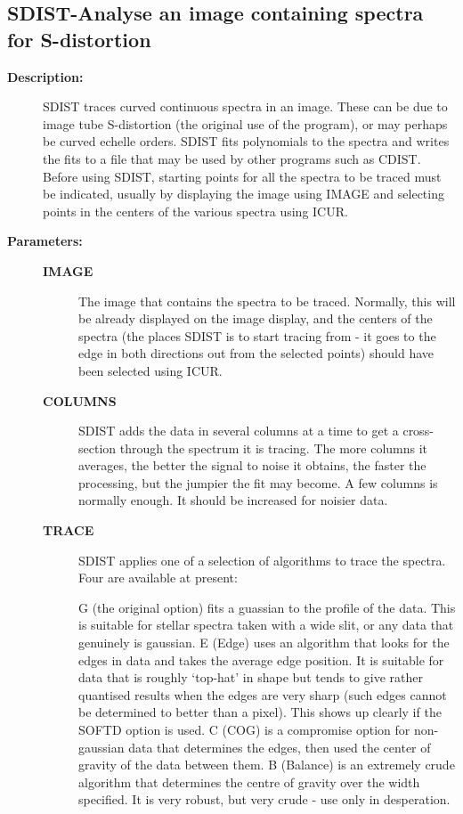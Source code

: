 \subsection{SDIST-\label{SDIST}Analyse an image containing spectra for S-distortion}
\begin{description}

\item [{\bf Description:}]
 SDIST traces curved continuous spectra in an image.  These can be
 due to image tube S-distortion (the original use of the program),
 or may perhaps be curved echelle orders.  SDIST fits polynomials
 to the spectra and writes the fits to a file that may be used by
 other programs such as CDIST.  Before using SDIST, starting points
 for all the spectra to be traced must be indicated, usually by
 displaying the image using IMAGE and selecting points in the
 centers of the various spectra using ICUR.

\item [{\bf Parameters:}]
\begin{description}
\item [{\bf IMAGE}]
 The image that contains the spectra to be traced.
 Normally, this will be already displayed on the image display, and
 the centers of the spectra (the places SDIST is to start tracing from
 - it goes to the edge in both directions out from the selected
 points) should have been selected using ICUR.
\item [{\bf COLUMNS}]
 SDIST adds the data in several columns at a time to get a
 cross-section through the spectrum it is tracing.  The more columns
 it averages, the better the signal to noise it obtains, the faster
 the processing, but the jumpier the fit may become.  A few columns is
 normally enough.  It should be increased for noisier data.
\item [{\bf TRACE}]
 SDIST applies one of a selection of algorithms to trace
 the spectra. Four are available at present:

    G (the original option) fits a guassian to the profile of the data.
      This is suitable for stellar spectra taken with a wide slit, or
      any data that genuinely is gaussian.
    E (Edge) uses an algorithm that looks for the edges in data and
      takes the average edge position. It is suitable for data that is
      roughly `top-hat' in shape but tends to give rather quantised
      results when the edges are very sharp (such edges cannot be
      determined to better than a pixel). This shows up clearly if the
      SOFTD option is used.
    C (COG) is a compromise option for non-gaussian data that determines
      the edges, then used the center of gravity of the data between
      them.
    B (Balance) is an extremely crude algorithm that determines the
      centre of gravity over the width specified. It is very robust, but
      very crude - use only in desperation.


\end{description}
\end{description}
